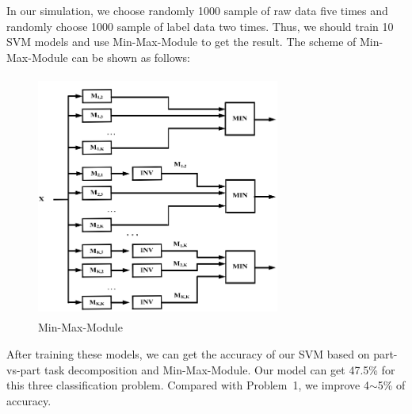 \documentclass[12pt,onecolumn]{IEEEtran}
\begin{document}
In our simulation, we choose randomly 1000 sample of raw data five times and randomly choose 1000 sample of label data two times. Thus, we should train 10 SVM models and use Min-Max-Module to get the result. The scheme of Min-Max-Module can be shown as follows:
\begin{figure}[H]
\centering
\includegraphics[width=8cm,height=8cm]{M3.png}
\caption{Min-Max-Module}
\end{figure}

After training these models, we can get the accuracy of our SVM based on part-vs-part task decomposition and Min-Max-Module. Our model can get 47.5\% for this three classification problem. Compared with Problem~1, we improve 4$\sim$5\% of accuracy. 
\end{document}
